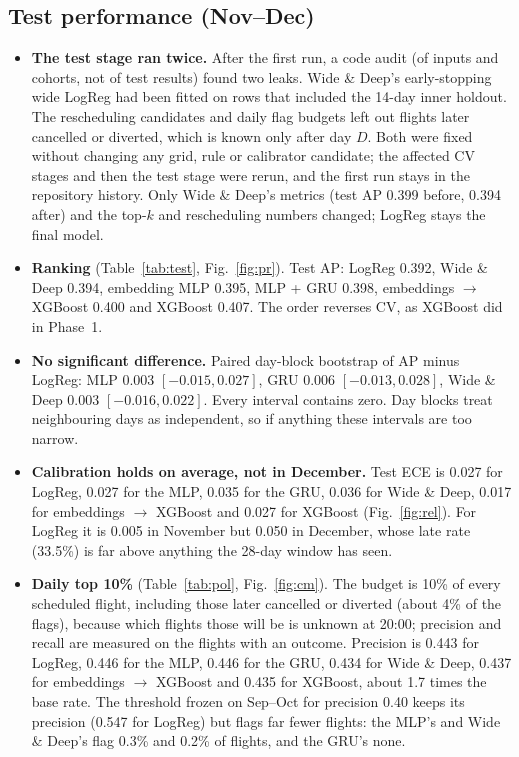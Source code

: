 \documentclass[conference]{IEEEtran}
\begin{document}
\subsection{Test performance (Nov--Dec)}
\begin{itemize}
\item \textbf{The test stage ran twice.} After the first run, a code audit (of inputs and cohorts, not of test results) found two leaks. Wide \& Deep's early-stopping wide LogReg had been fitted on rows that included the 14-day inner holdout. The rescheduling candidates and daily flag budgets left out flights later cancelled or diverted, which is known only after day $D$. Both were fixed without changing any grid, rule or calibrator candidate; the affected CV stages and then the test stage were rerun, and the first run stays in the repository history. Only Wide \& Deep's metrics (test AP 0.399 before, 0.394 after) and the top-$k$ and rescheduling numbers changed; LogReg stays the final model.
\item \textbf{Ranking} (Table~\ref{tab:test}, Fig.~\ref{fig:pr}). Test AP: LogReg 0.392, Wide \& Deep 0.394, embedding MLP 0.395, MLP + GRU 0.398, embeddings $\rightarrow$ XGBoost 0.400 and XGBoost 0.407. The order reverses CV, as XGBoost did in Phase~1.
\item \textbf{No significant difference.} Paired day-block bootstrap of AP minus LogReg: MLP 0.003 $[-0.015, 0.027]$, GRU 0.006 $[-0.013, 0.028]$, Wide \& Deep 0.003 $[-0.016, 0.022]$. Every interval contains zero. Day blocks treat neighbouring days as independent, so if anything these intervals are too narrow.
\item \textbf{Calibration holds on average, not in December.} Test ECE is 0.027 for LogReg, 0.027 for the MLP, 0.035 for the GRU, 0.036 for Wide \& Deep, 0.017 for embeddings $\rightarrow$ XGBoost and 0.027 for XGBoost (Fig.~\ref{fig:rel}). For LogReg it is 0.005 in November but 0.050 in December, whose late rate (33.5\%) is far above anything the 28-day window has seen.
\item \textbf{Daily top 10\%} (Table~\ref{tab:pol}, Fig.~\ref{fig:cm}). The budget is 10\% of every scheduled flight, including those later cancelled or diverted (about 4\% of the flags), because which flights those will be is unknown at 20:00; precision and recall are measured on the flights with an outcome. Precision is 0.443 for LogReg, 0.446 for the MLP, 0.446 for the GRU, 0.434 for Wide \& Deep, 0.437 for embeddings $\rightarrow$ XGBoost and 0.435 for XGBoost, about 1.7 times the base rate. The threshold frozen on Sep--Oct for precision 0.40 keeps its precision (0.547 for LogReg) but flags far fewer flights: the MLP's and Wide \& Deep's flag 0.3\% and 0.2\% of flights, and the GRU's none.
\end{itemize}
\end{document}
